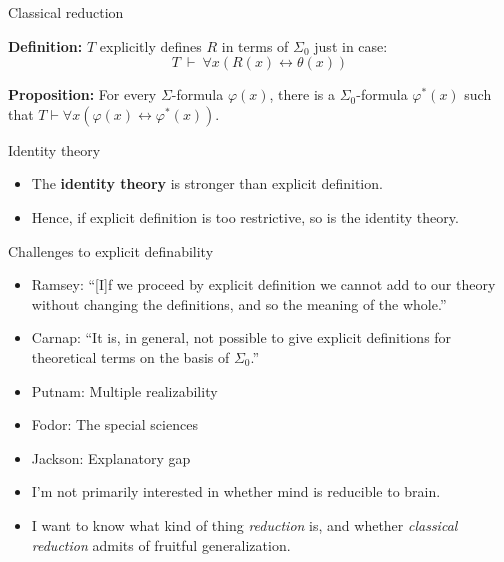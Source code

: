 \documentclass[fleqn]{beamer}
\begin{document}
\begin{frame}{Classical reduction}

  \textbf{Definition:} $T$ explicitly defines $R$ in terms of
  $\Sigma _0$ just in case:
  \[ T\:\vdash \: \forall x(R(x)\leftrightarrow \theta (x)) \]

  \textbf{Proposition:} For every $\Sigma$-formula $\varphi (x)$,
  there is a $\Sigma _0$-formula $\varphi ^*(x)$ such that
  $T\vdash \forall x(\varphi (x)\leftrightarrow \varphi ^* (x))$.

\end{frame}

\begin{frame}{Identity theory}

  \begin{itemize}
  \item The \textbf{identity theory} is stronger than explicit
    definition.
  \item Hence, if explicit definition is too restrictive, so is the
    identity theory.
  \end{itemize}

\end{frame}

\begin{frame}{Challenges to explicit definability}

  \begin{itemize}
  \item Ramsey: ``[I]f we proceed by explicit definition we cannot add
    to our theory without changing the definitions, and so the meaning
    of the whole.''
  \item Carnap: ``It is, in general, not possible to give explicit
    definitions for theoretical terms on the basis of $\Sigma _0$.''
    \citeyearpar[p 42]{carnap}
  \item Putnam: Multiple realizability
  \item Fodor: The special sciences
  \item Jackson: Explanatory gap
  \end{itemize}

\end{frame}

\begin{frame}

  \begin{itemize}
  \item I'm not primarily interested in whether mind is reducible to
    brain.
  \item I want to know what kind of thing \emph{reduction} is, and
    whether \emph{classical reduction} admits of fruitful
    generalization.
  \end{itemize}

\end{frame}
\end{document}
